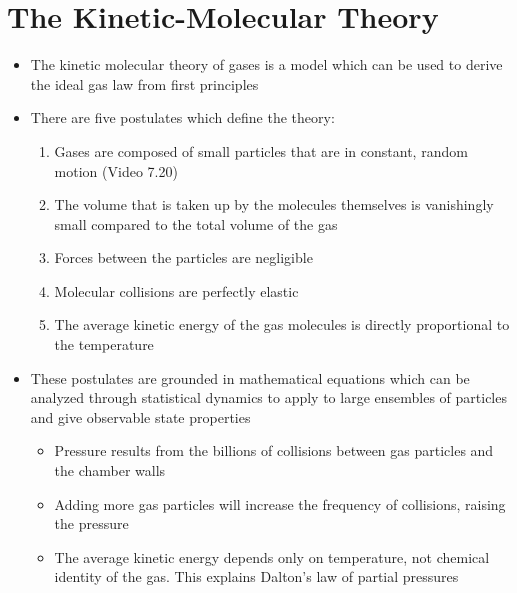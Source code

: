 \documentclass[12pt, openany, letterpaper]{memoir}
\begin{document}
\section{The Kinetic-Molecular Theory}
\begin{itemize}
  \item The kinetic molecular theory of gases is a model which can be used to derive the ideal gas law from first principles
  \item There are five postulates which define the theory:
    \begin{enumerate}
      \item Gases are composed of small particles that are in constant, random motion (Video 7.20)
      \item The volume that is taken up by the molecules themselves is vanishingly small compared to the total volume of the gas
      \item Forces between the particles are negligible
      \item Molecular collisions are perfectly elastic
      \item The average kinetic energy of the gas molecules is directly proportional to the temperature
    \end{enumerate}
  \item These postulates are grounded in mathematical equations which can be analyzed through statistical dynamics to apply to large ensembles of particles and give observable state properties
    \begin{itemize}
      \item Pressure results from the billions of collisions between gas particles and the chamber walls
      \item Adding more gas particles will increase the frequency of collisions, raising the pressure
      \item The average kinetic energy depends only on temperature, not chemical identity of the gas. This explains Dalton's law of partial pressures
    \end{itemize}
\end{itemize}
\end{document}
